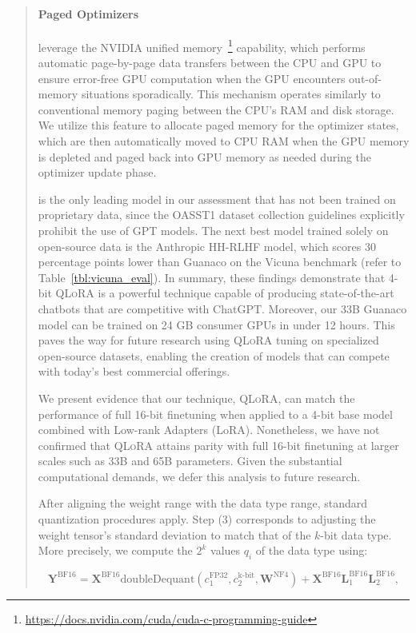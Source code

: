 \begin{quote}
\paragraph{Paged Optimizers} leverage the NVIDIA unified memory~\footnote{\tiny \url{https://docs.nvidia.com/cuda/cuda-c-programming-guide}} capability, which performs automatic page-by-page data transfers between the CPU and GPU to ensure error-free GPU computation when the GPU encounters out-of-memory situations sporadically. This mechanism operates similarly to conventional memory paging between the CPU's RAM and disk storage. We utilize this feature to allocate paged memory for the optimizer states, which are then automatically moved to CPU RAM when the GPU memory is depleted and paged back into GPU memory as needed during the optimizer update phase.

is the only leading model in our assessment that has not been trained on proprietary data, since the OASST1 dataset collection guidelines explicitly prohibit the use of GPT models. The next best model trained solely on open-source data is the Anthropic HH-RLHF model, which scores 30 percentage points lower than {Guanaco} on the Vicuna benchmark (refer to Table~\ref{tbl:vicuna_eval}). In summary, these findings demonstrate that 4-bit \textsc{QLoRA} is a powerful technique capable of producing state-of-the-art chatbots that are competitive with ChatGPT. Moreover, our 33B {Guanaco} model can be trained on 24 GB consumer GPUs in under 12 hours. This paves the way for future research using \textsc{QLoRA} tuning on specialized open-source datasets, enabling the creation of models that can compete with today’s best commercial offerings.

We present evidence that our technique, \textsc{QLoRA}, can match the performance of full 16-bit finetuning when applied to a 4-bit base model combined with Low-rank Adapters (LoRA). Nonetheless, we have not confirmed that \textsc{QLoRA} attains parity with full 16-bit finetuning at larger scales such as 33B and 65B parameters. Given the substantial computational demands, we defer this analysis to future research.

After aligning the weight range with the data type range, standard quantization procedures apply. Step (3) corresponds to adjusting the weight tensor’s standard deviation to match that of the $k$-bit data type. More precisely, we compute the $2^k$ values $q_i$ of the data type using:

\begin{equation}
    \mathbf{Y}^{\text{BF16}} =  \mathbf{X}^{\text{BF16}} \text{doubleDequant}(c_1^{\text{FP32}}, c_2^{\text{k-bit}}, \mathbf{W}^{\text{NF4}}) + \mathbf{X}^{\text{BF16}}\mathbf{L}^{\text{BF16}}_1\mathbf{L}^{\text{BF16}}_2,
\end{equation}


\end{quote}

